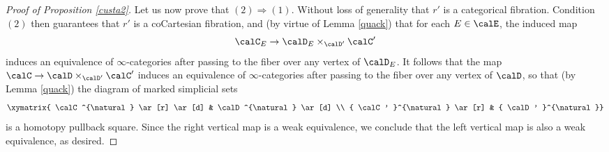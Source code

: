 \begin{proof}[Proof of Proposition \ref{custa2}]
Let us now prove that $(2) \Rightarrow (1)$. Without loss of generality that $r'$ is a categorical fibration. 
Condition $(2)$ then guarantees that $r'$ is a coCartesian fibration, and (by virtue of Lemma \ref{quack}) that for each $E \in \calE$, the induced map
$$ \calC_{E} \rightarrow \calD_{E} \times_{ \calD' } \calC'$$
induces an equivalence of $\infty$-categories after passing to the fiber over any vertex of $\calD_{E}$.
It follows that the map $\calC \rightarrow \calD \times_{ \calD' } \calC'$ induces an equivalence of
$\infty$-categories after passing to the fiber over any vertex of $\calD$, so that (by Lemma \ref{quack}) the diagram of marked simplicial sets
$$ \xymatrix{ \calC^{\natural} \ar[r] \ar[d] & \calD^{\natural} \ar[d] \\
{ \calC' }^{\natural} \ar[r] & { \calD' }^{\natural }}$$
is a homotopy pullback square. Since the right vertical map is a weak equivalence, we conclude that the left vertical map is also a weak equivalence, as desired.
\end{proof}


